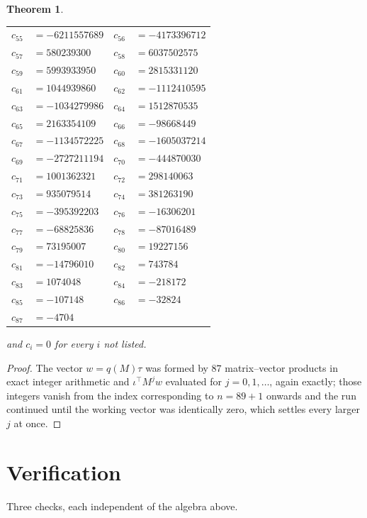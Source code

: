 \documentclass[11pt,a4paper]{article}
\theoremstyle{plain}
\newtheorem{theorem}{Theorem}
\theoremstyle{definition}
\begin{document}
\begin{theorem}
\begin{center}
\begin{tabular}{r@{\,}l@{\qquad}r@{\,}l}
$c_{55}$ & $=-6211557689$ & $c_{56}$ & $=-4173396712$ \\
$c_{57}$ & $=580239300$ & $c_{58}$ & $=6037502575$ \\
$c_{59}$ & $=5993933950$ & $c_{60}$ & $=2815331120$ \\
$c_{61}$ & $=1044939860$ & $c_{62}$ & $=-1112410595$ \\
$c_{63}$ & $=-1034279986$ & $c_{64}$ & $=1512870535$ \\
$c_{65}$ & $=2163354109$ & $c_{66}$ & $=-98668449$ \\
$c_{67}$ & $=-1134572225$ & $c_{68}$ & $=-1605037214$ \\
$c_{69}$ & $=-2727211194$ & $c_{70}$ & $=-444870030$ \\
$c_{71}$ & $=1001362321$ & $c_{72}$ & $=298140063$ \\
$c_{73}$ & $=935079514$ & $c_{74}$ & $=381263190$ \\
$c_{75}$ & $=-395392203$ & $c_{76}$ & $=-16306201$ \\
$c_{77}$ & $=-68825836$ & $c_{78}$ & $=-87016489$ \\
$c_{79}$ & $=73195007$ & $c_{80}$ & $=19227156$ \\
$c_{81}$ & $=-14796010$ & $c_{82}$ & $=743784$ \\
$c_{83}$ & $=1074048$ & $c_{84}$ & $=-218172$ \\
$c_{85}$ & $=-107148$ & $c_{86}$ & $=-32824$ \\
$c_{87}$ & $=-4704$ \\
\end{tabular}
\end{center}
and $c_i=0$ for every $i$ not listed.
\end{theorem}

\begin{proof}
The vector $w=q(M)\tau$ was formed by $87$ matrix--vector products in exact integer
arithmetic and $\iota^{\!\top}M^{j}w$ evaluated for $j=0,1,\dots$, again exactly; those
integers vanish from the index corresponding to $n=89+1$ onwards and the run continued
until the working vector was identically zero, which settles every larger $j$ at once.
\end{proof}

\section{Verification}

Three checks, each independent of the algebra above.
\end{document}
